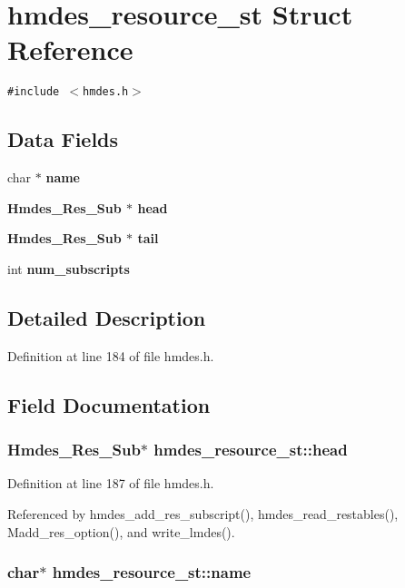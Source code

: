 \section{hmdes\_\-resource\_\-st Struct Reference}
\label{structhmdes__resource__st}
{\tt \#include $<$hmdes.h$>$}

\subsection*{Data Fields}
\begin{CompactItemize}
\item 
char $\ast$ \bf{name}
\item 
\bf{Hmdes\_\-Res\_\-Sub} $\ast$ \bf{head}
\item 
\bf{Hmdes\_\-Res\_\-Sub} $\ast$ \bf{tail}
\item 
int \bf{num\_\-subscripts}
\end{CompactItemize}


\subsection{Detailed Description}




Definition at line 184 of file hmdes.h.

\subsection{Field Documentation}
\subsubsection{\setlength{\rightskip}{0pt plus 5cm}\bf{Hmdes\_\-Res\_\-Sub}$\ast$ \bf{hmdes\_\-resource\_\-st::head}}\label{structhmdes__resource__st_bfaf104c2a6fc140cc5e496eb9ba8512}




Definition at line 187 of file hmdes.h.

Referenced by hmdes\_\-add\_\-res\_\-subscript(), hmdes\_\-read\_\-restables(), Madd\_\-res\_\-option(), and write\_\-lmdes().
\subsubsection{\setlength{\rightskip}{0pt plus 5cm}char$\ast$ \bf{hmdes\_\-resource\_\-st::name}}\label{structhmdes__resource__st_bb3acea2756d84fed3b9482e20a9746c}




